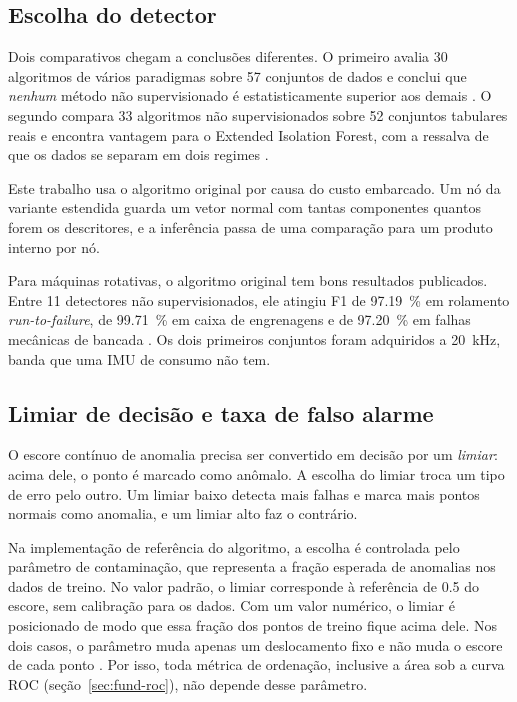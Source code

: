 \subsection{Escolha do detector}
\label{sec:rev-detector}

Dois comparativos chegam a conclusões diferentes. O primeiro avalia \num{30} algoritmos de vários paradigmas
sobre \num{57} conjuntos de dados e conclui que \emph{nenhum} método não supervisionado é estatisticamente superior aos demais \cite{han2022}. O segundo compara
\num{33} algoritmos não supervisionados sobre \num{52} conjuntos tabulares reais e encontra vantagem para o Extended Isolation Forest, com a ressalva de que os
dados se separam em dois regimes \cite{bouman2024}.

Este trabalho usa o algoritmo original por causa do custo embarcado. Um nó da variante estendida guarda um vetor normal com tantas componentes quantos forem os
descritores, e a inferência passa de uma comparação para um produto interno por nó. 

Para máquinas rotativas, o algoritmo original tem bons resultados publicados. Entre \num{11} detectores não supervisionados, ele atingiu F1 de \SI{97,19}{\percent}
em rolamento \emph{run-to-failure}, de \SI{99,71}{\percent} em caixa de engrenagens e de \SI{97,20}{\percent} em falhas mecânicas de bancada \cite{brito2022}. Os dois
primeiros conjuntos foram adquiridos a \SI{20}{\kilo\hertz}, banda que uma IMU de consumo não tem.

\subsection{Limiar de decisão e taxa de falso alarme}
\label{sec:fund-limiar}

O escore contínuo de anomalia precisa ser convertido em decisão por um \emph{limiar}: acima dele, o ponto é marcado como anômalo. A escolha do limiar troca um tipo de
erro pelo outro. Um limiar baixo detecta mais falhas e marca mais pontos normais como anomalia, e um limiar alto faz o contrário.

Na implementação de referência do algoritmo, a escolha é controlada pelo parâmetro de contaminação, que representa a fração esperada de anomalias nos dados de treino.
No valor padrão, o limiar corresponde à referência de \num{0,5} do escore, sem calibração para os dados. Com um valor numérico, o limiar é posicionado de modo que essa
fração dos pontos de treino fique acima dele. Nos dois casos, o parâmetro muda apenas um deslocamento fixo e não muda o escore de cada ponto \cite{liu2008,scikitlearn2026}.
Por isso, toda métrica de ordenação, inclusive a área sob a curva ROC (seção~\ref{sec:fund-roc}), não depende desse parâmetro.

